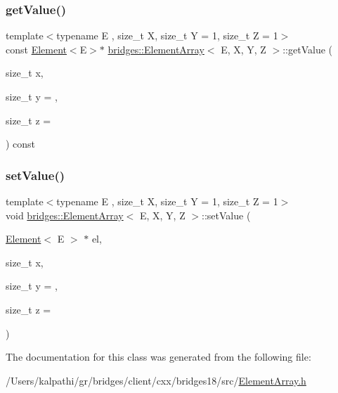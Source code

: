 \mbox{\label{classbridges_1_1_element_array_a9e15557584b74ac7909cac00a2ab4fbe}} 
\subsubsection{\texorpdfstring{get\+Value()}{getValue()}\hspace{0.1cm}{\footnotesize\ttfamily [2/2]}}
{\footnotesize\ttfamily template$<$typename E , size\+\_\+t X, size\+\_\+t Y = 1, size\+\_\+t Z = 1$>$ \\
const \mbox{\hyperlink{classbridges_1_1_element}{Element}}$<$E$>$$\ast$ \mbox{\hyperlink{classbridges_1_1_element_array}{bridges\+::\+Element\+Array}}$<$ E, X, Y, Z $>$\+::get\+Value (\begin{DoxyParamCaption}\item[{size\+\_\+t}]{x,  }\item[{size\+\_\+t}]{y = {},  }\item[{size\+\_\+t}]{z = {} }\end{DoxyParamCaption}) const\hspace{0.3cm}{\ttfamily [inline]}}

\mbox{\label{classbridges_1_1_element_array_a202def849cd345d8b56ebcb31f332d25}} 
\subsubsection{\texorpdfstring{set\+Value()}{setValue()}}
{\footnotesize\ttfamily template$<$typename E , size\+\_\+t X, size\+\_\+t Y = 1, size\+\_\+t Z = 1$>$ \\
void \mbox{\hyperlink{classbridges_1_1_element_array}{bridges\+::\+Element\+Array}}$<$ E, X, Y, Z $>$\+::set\+Value (\begin{DoxyParamCaption}\item[{\mbox{\hyperlink{classbridges_1_1_element}{Element}}$<$ E $>$ $\ast$}]{el,  }\item[{size\+\_\+t}]{x,  }\item[{size\+\_\+t}]{y = {},  }\item[{size\+\_\+t}]{z = {} }\end{DoxyParamCaption})\hspace{0.3cm}{\ttfamily [inline]}}



The documentation for this class was generated from the following file\+:\begin{DoxyCompactItemize}
\item 
/\+Users/kalpathi/gr/bridges/client/cxx/bridges18/src/\mbox{\hyperlink{_element_array_8h}{Element\+Array.\+h}}\end{DoxyCompactItemize}
